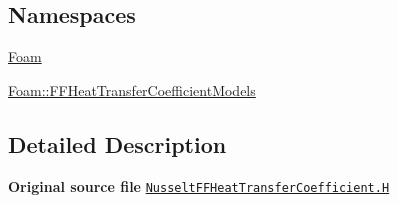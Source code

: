 \subsection*{Namespaces}
\begin{DoxyCompactItemize}
\item 
 \hyperlink{namespaceFoam}{Foam}
\item 
 \hyperlink{namespaceFoam_1_1FFHeatTransferCoefficientModels}{Foam\+::\+F\+F\+Heat\+Transfer\+Coefficient\+Models}
\end{DoxyCompactItemize}


\subsection{Detailed Description}
{\bfseries Original source file} \href{../../../home/carlo/data/GeN-Foam/GeN-Foam_ffn/GeN-Foam/GeN-Foam/classes/thermalHydraulics/src/physicsModels/heatTransferModels/FFHeatTransferCoefficientModels/Nusselt/NusseltFFHeatTransferCoefficient.H}{\tt Nusselt\+F\+F\+Heat\+Transfer\+Coefficient.\+H} 